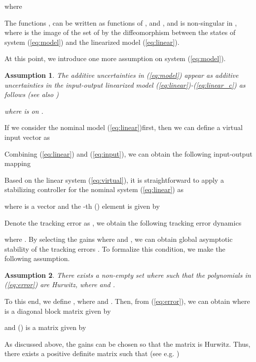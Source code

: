 \documentclass[twoside,leqno,onecolumn]{article}
\newtheorem{assumption}{Assumption}
\begin{document}
where

The functions ,  can be written as functions of
,  and , and  is non-singular in ,
where  is the image of the set of  by the
diffeomorphism  between the states of system
(\ref{eq:model}) and the linearized model (\ref{eq:linear}).

At this point, we introduce one more assumption on system (\ref{eq:model}).

\begin{assumption}
The additive uncertainties  in (\ref{eq:model})
appear as additive uncertainties in the input-output linearized
model (\ref{eq:linear})-(\ref{eq:linear_c}) as follows (see also
\cite{Beno09})

where  is  on .
\end{assumption}

If we consider the nominal model (\ref{eq:linear})first, then we can define a virtual input vector  as

Combining (\ref{eq:linear}) and (\ref{eq:input}), we can obtain the following input-output mapping

Based on the linear system (\ref{eq:virtual}), it is straightforward to apply a stabilizing controller for the nominal system (\ref{eq:linear}) as

where  is a  vector and the -th () element  is given by

Denote the tracking error as , we obtain  the following tracking error dynamics

where . By selecting the gains 
where  and ,
we can obtain global asymptotic stability of the tracking errors
. To formalize this condition, we make the following
assumption.

\begin{assumption}
There exists a non-empty set  where
 such that the polynomials in
(\ref{eq:error}) are Hurwitz, where 
and .
\end{assumption}



To this end, we define , where  and . Then, from (\ref{eq:error}), we can obtain
where  is a diagonal block matrix given by

and  () is a  matrix given by

As discussed above, the gains  can be chosen so that the
matrix  is Hurwitz. Thus, there exists a positive
definite matrix  such that (see e.g. \cite{Khalil02})
 
\end{document}
